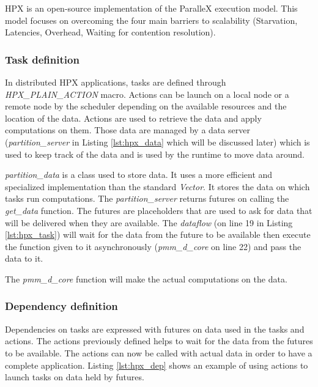 HPX is an open-source implementation of the ParalleX execution model.
This model focuses on overcoming the four main barriers to scalability (Starvation, Latencies, Overhead, Waiting for contention resolution).

\begin{figure}[h]

\end{figure}


\subsubsection{Task definition}
In distributed HPX applications, tasks are defined through \textit{HPX\_PLAIN\_ACTION} macro.
Actions can be launch on a local node or a remote node by the scheduler depending on the available resources and the location of the data.
Actions are used to retrieve the data and apply computations on them.
Those data are managed by a data server (\textit{partition\_server} in Listing \ref{lst:hpx_data} which will be discussed later) which is used to keep track of the data and is used by the runtime to move data around.

\textit{partition\_data} is a class used to store data.
It uses a more efficient and specialized implementation than the standard \textit{Vector}.
It stores the data on which tasks run computations.
The \textit{partition\_server} returns futures on calling the \textit{get\_data} function.
The futures are placeholders that are used to ask for data that will be delivered when they are available.
The \textit{dataflow} (on line 19 in Listing \ref{lst:hpx_task}) will wait for the data from the future to be available then execute the function given to it asynchronously (\textit{pmm\_d\_core} on line 22) and pass the data to it.

The \textit{pmm\_d\_core} function will make the actual computations on the data.

\subsubsection{Dependency definition}
Dependencies on tasks are expressed with futures on data used in the tasks and actions.
The actions previously defined helps to wait for the data from the futures to be available.
The actions can now be called with actual data in order to have a complete application.
Listing \ref{lst:hpx_dep} shows an example of using actions to launch tasks on data held by futures.

